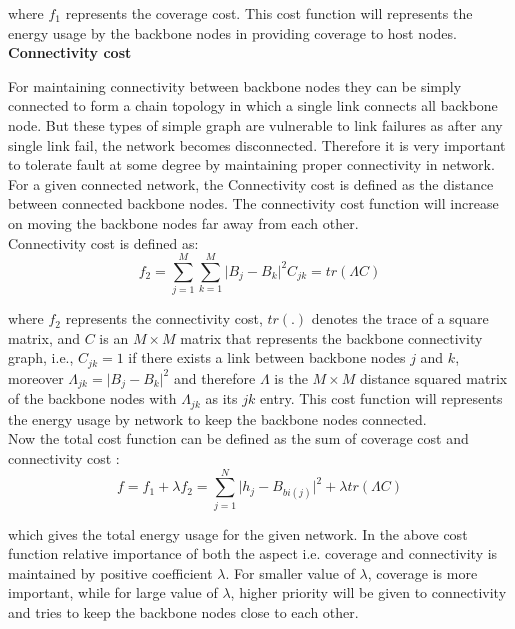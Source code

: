 \documentclass[11pt]{article}
\numberwithin{equation}{section}
\begin{document}
where $f_1$ represents the coverage cost. This cost function will represents the energy usage by the backbone nodes in providing coverage to host nodes.\\

\noindent \textbf{Connectivity cost}

For maintaining connectivity between backbone nodes they can be simply connected to form a chain topology in which a single link connects all backbone node. But these types of simple graph are vulnerable to link failures as after any single link fail, the network becomes disconnected. Therefore it is very important to tolerate fault at some degree by maintaining proper connectivity in network. For a given connected network, the Connectivity cost is defined as the distance between connected backbone nodes. The connectivity cost function will increase on moving the backbone nodes far away from each other.\\

Connectivity cost is defined as:
\begin{equation}\label{e22}
f_{2}=\sum\limits_{j=1}^{M}\sum\limits_{k=1}^{M}{\vert B_{j}-B_{k}\vert}^{2}C_{jk}=tr(\Lambda C)
\end{equation}


where $f_2$ represents the connectivity cost, $tr(.)$ denotes the trace of a square matrix, and $C $ is an $M \times M$ matrix that represents the backbone connectivity graph, i.e., $ C_{jk} = 1$ if there exists a link between backbone nodes $j$ and $k$, moreover $\Lambda_{jk}= {\vert B_{j}-B_{k}\vert}^{2} $ and therefore $\Lambda$ is the $M \times M$ distance squared matrix of the backbone nodes with $\Lambda_{jk}$ as its $jk$ entry. This cost function will represents the energy usage by network to keep the backbone nodes connected.\\

Now the total cost function  can be defined as the sum of coverage cost and connectivity cost :
\begin{equation}\label{e23}
f=f_{1}+\lambda f_{2}=\sum\limits_{j=1}^{N}{\vert h_{j}-B_{bi(j)}\vert}^{2}+
\lambda tr(\Lambda C)
\end{equation}


which gives the total energy usage for the given network. In the above cost function relative importance of both the aspect i.e. coverage and connectivity is maintained by positive coefficient $\lambda$. For smaller value of $\lambda$, coverage is more important, while for large value of $\lambda$, higher priority will be given to connectivity and tries to keep the backbone nodes close to each other.
\end{document}

